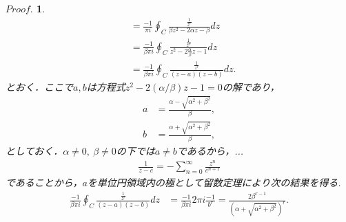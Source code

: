 \documentclass[a4j,papersize,disablejfam,slide,14pt]{jsarticle}
\newtheorem{Proof}{$Proof.$}
\begin{document}
\begin{Proof}
\begin{align}
            &= \frac{-1}{\pi i} \oint_{C} \frac{\frac{1}{z^r}}{\beta z^2 - 2\alpha z - \beta} dz \\
            &= \frac{-1}{\beta \pi i} \oint_{C} \frac{\frac{1}{z^r}}{z^2 - 2 \frac{\alpha}{\beta} z - 1} dz \\
            &= \frac{-1}{\beta \pi i} \oint_{C} \frac{\frac{1}{z^r}}{(z-a)(z-b)} dz.
        \end{align}
        とおく．ここで$a,b$は方程式$z^2 - 2 (\alpha/\beta) z - 1=0$の解であり，
        \begin{align}
        	a &= \frac{\alpha - \sqrt{\alpha^2 + \beta^2}}{\beta}, \\
            b &= \frac{\alpha + \sqrt{\alpha^2 + \beta^2}}{\beta},
        \end{align}
        としておく．$\alpha \neq 0,\ \beta \neq 0$の下では$a \neq b$であるから，...
        \begin{align}
        	\frac{1}{z-c} = -\sum_{n=0}^{\infty} \frac{z^n}{c^{n+1}}
        \end{align}
        であることから，$a$を単位円領域内の極として留数定理により次の結果を得る.
        \begin{align}
        	\frac{-1}{\beta \pi i} \oint_{C} \frac{\frac{1}{z^r}}{(z-a)(z-b)} dz &= \frac{-1}{\beta \pi i} 2 \pi i \frac{-1}{b^r} 
            = \frac{2\beta^{r-1}}{\left( \alpha + \sqrt{\alpha^2 + \beta^2} \right)^r}.
        \end{align}
        
    \end{Proof}
\end{document}
